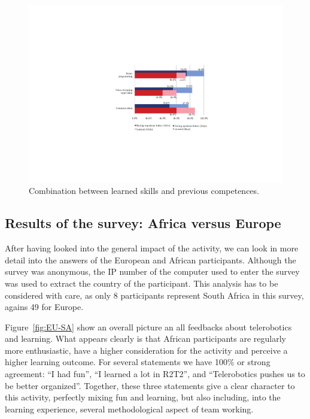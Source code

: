 \documentclass{intech-journal}
\begin{document}
\begin{figure}[ht]
 \centering
    \includegraphics[width=0.6\columnwidth]{figures/learned.pdf}
  \caption{Combination between learned skills and previous competences.}
  \label{fig:learned} 
\end{figure}

\subsection{Results of the survey: Africa versus Europe}

After having looked into the general impact of the activity, we can look in more detail into the answers of the European and African participants. 
Although the survey was anonymous, the IP number of the computer used to enter the survey was used to extract the country of the participant.
This analysis has to be considered with care, as only 8 participants represent South Africa in this survey, agains 49 for Europe.


Figure~\ref{fig:EU-SA} show an overall picture an all feedbacks about telerobotics and learning.
What appears clearly is that African participants are regularly more enthusiastic, have a higher consideration for the activity and perceive a higher learning outcome. 
For several statements we have 100\% or strong agreement: ``I had fun'', ``I learned a lot in R2T2'', and ``Telerobotics pushes us to be better organized''.
Together, these three statements give a clear character to this activity, perfectly mixing fun and learning, but also including, into the learning experience, several methodological aspect of team working. 
\end{document}
